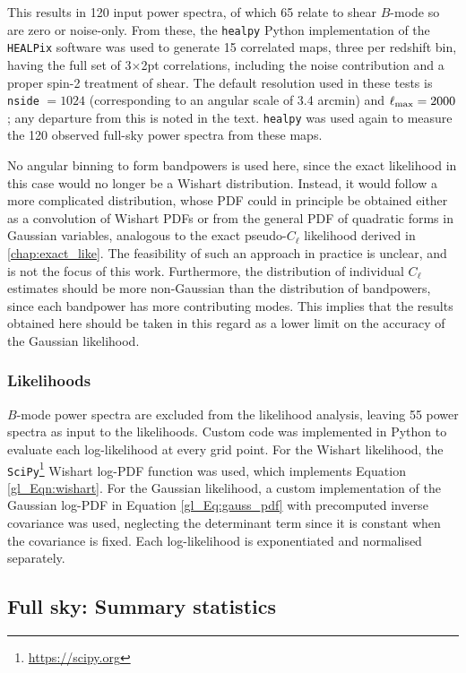 This results in 120 input power spectra, of which 65 relate to shear $B$-mode so are zero or noise-only. From these, the \texttt{healpy} Python implementation of the \texttt{HEALPix} software \citep{Gorski2005, Zonca2019} was used to generate 15 correlated maps, three per redshift bin, having the full set of 3$\times$2pt correlations, including the noise contribution and a proper spin-2 treatment of shear. The default resolution used in these tests is \texttt{nside} $= 1024$ (corresponding to an angular scale of 3.4 arcmin) and $\ell_\text{max} = 2000$; any departure from this is noted in the text. \texttt{healpy} was used again to measure the 120 observed full-sky power spectra from these maps.

No angular binning to form bandpowers is used here, since the exact likelihood in this case would no longer be a Wishart distribution. Instead, it would follow a more complicated distribution, whose PDF could in principle be obtained either as a convolution of Wishart PDFs or from the general PDF of quadratic forms in Gaussian variables, analogous to the exact pseudo-$C_\ell$ likelihood derived in \autoref{chap:exact_like}. The feasibility of such an approach in practice is unclear, and is not the focus of this work. Furthermore, the distribution of individual $C_\ell$ estimates should be more non-Gaussian than the distribution of bandpowers, since each bandpower has more contributing modes. This implies that the results obtained here should be taken in this regard as a lower limit on the accuracy of the Gaussian likelihood.

\subsubsection{Likelihoods}

$B$-mode power spectra are excluded from the likelihood analysis, leaving 55 power spectra as input to the likelihoods. Custom code was implemented in Python to evaluate each log-likelihood at every grid point. For the Wishart likelihood, the \texttt{SciPy}\footnote{\url{https://scipy.org}} Wishart log-PDF function \citep{Virtanen2020} was used, which implements Equation \eqref{gl_Eqn:wishart}. For the Gaussian likelihood, a custom implementation of the Gaussian log-PDF in Equation \eqref{gl_Eq:gauss_pdf} with precomputed inverse covariance was used, neglecting the determinant term since it is constant when the covariance is fixed. Each log-likelihood is exponentiated and normalised separately.

\subsection{Full sky: Summary statistics}
\label{gl_Sec:fs_sumstat}

